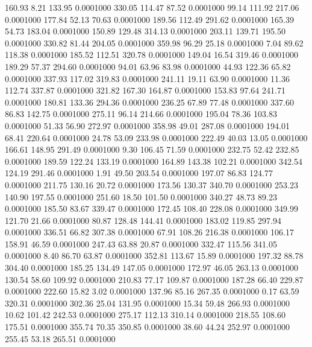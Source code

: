  160.93    8.21  133.95   0.0001000
 330.05  114.47   87.52   0.0001000
  99.14  111.92  217.06   0.0001000
 177.84   52.13   70.63   0.0001000
 189.56  112.49  291.62   0.0001000
 165.39   54.73  183.04   0.0001000
 150.89  129.48  314.13   0.0001000
 203.11  139.71  195.50   0.0001000
 330.82   81.44  204.05   0.0001000
 359.98   96.29   25.18   0.0001000
   7.04   89.62  118.38   0.0001000
 185.52  112.51  320.78   0.0001000
 149.04   16.54  319.46   0.0001000
 189.29   57.37  294.60   0.0001000
  94.01   63.96   83.98   0.0001000
  44.93  122.36   65.82   0.0001000
 337.93  117.02  319.83   0.0001000
 241.11   19.11   63.90   0.0001000
  11.36  112.74  337.87   0.0001000
 321.82  167.30  164.87   0.0001000
 153.83   97.64  241.71   0.0001000
 180.81  133.36  294.36   0.0001000
 236.25   67.89   77.48   0.0001000
 337.60   86.83  142.75   0.0001000
 275.11   96.14  214.66   0.0001000
 195.04   78.36  103.83   0.0001000
  51.33   56.90  272.97   0.0001000
 358.98   49.01  287.08   0.0001000
 194.01   68.41  220.64   0.0001000
  24.78   53.09  233.98   0.0001000
 222.49   40.03   13.05   0.0001000
 166.61  148.95  291.49   0.0001000
   9.30  106.45   71.59   0.0001000
 232.75   52.42  232.85   0.0001000
 189.59  122.24  133.19   0.0001000
 164.89  143.38  102.21   0.0001000
 342.54  124.19  291.46   0.0001000
   1.91   49.50  203.54   0.0001000
 197.07   86.83  124.77   0.0001000
 211.75  130.16   20.72   0.0001000
 173.56  130.37  340.70   0.0001000
 253.23  140.90  197.55   0.0001000
 251.60   18.50  101.50   0.0001000
 340.27   48.73   89.23   0.0001000
 185.50   83.67  339.47   0.0001000
 172.45  108.40  228.08   0.0001000
 349.99  121.70   21.66   0.0001000
  80.87  128.48  144.41   0.0001000
 183.02  119.85  297.94   0.0001000
 336.51   66.82  307.38   0.0001000
  67.91  108.26  216.38   0.0001000
 106.17  158.91   46.59   0.0001000
 247.43   63.88   20.87   0.0001000
 332.47  115.56  341.05   0.0001000
   8.40   86.70   63.87   0.0001000
 352.81  113.67   15.89   0.0001000
 197.32   88.78  304.40   0.0001000
 185.25  134.49  147.05   0.0001000
 172.97   46.05  263.13   0.0001000
 130.54   58.60  109.92   0.0001000
 210.83   77.17  109.87   0.0001000
 187.28   66.40  229.87   0.0001000
 222.60   15.82    3.02   0.0001000
 137.96   85.16  267.35   0.0001000
   0.17   63.59  320.31   0.0001000
 302.36   25.04  131.95   0.0001000
  15.34   59.48  266.93   0.0001000
  10.62  101.42  242.53   0.0001000
 275.17  112.13  310.14   0.0001000
 218.55  108.60  175.51   0.0001000
 355.74   70.35  350.85   0.0001000
  38.60   44.24  252.97   0.0001000
 255.45   53.18  265.51   0.0001000
